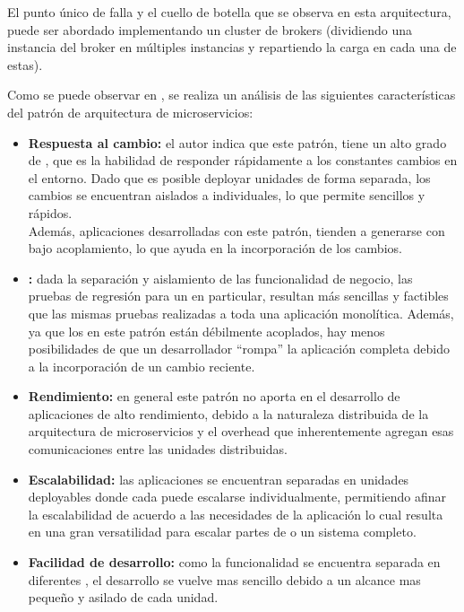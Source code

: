 El punto único de falla y el cuello de botella que se observa en esta arquitectura, puede ser abordado implementando un cluster de brokers (dividiendo una instancia del broker en múltiples instancias y repartiendo la carga en cada una de estas).\cite[p.~31]{richards2015}

Como se puede observar en \cite[p.~34]{richards2015}, se realiza un análisis de las siguientes características del patrón de arquitectura de microservicios:

\begin{itemize}
  \item \textbf{Respuesta al cambio:} el autor indica que este patrón, tiene un alto grado de , que es la habilidad de responder rápidamente a los constantes cambios en el entorno.  Dado que es posible deployar unidades de forma separada, los cambios se encuentran aislados a  individuales, lo que permite  sencillos y rápidos.\\
  Además, aplicaciones desarrolladas con este patrón, tienden a generarse con bajo acoplamiento, lo que ayuda en la incorporación de los cambios.

  \item \textbf{:} dada la separación y aislamiento de las funcionalidad de negocio, las pruebas de regresión para un  en particular, resultan más sencillas y factibles que las mismas pruebas realizadas a toda una aplicación monolítica.  Además, ya que los  en este patrón están débilmente acoplados, hay menos posibilidades de que un desarrollador ``rompa'' la aplicación completa debido a la incorporación de un cambio reciente.

  \item \textbf{Rendimiento:} en general este patrón no aporta en el desarrollo de aplicaciones de alto rendimiento, debido a la naturaleza distribuida de la arquitectura de microservicios y el overhead que inherentemente agregan esas comunicaciones entre las unidades distribuidas.

  \item \textbf{Escalabilidad:} las aplicaciones se encuentran separadas en unidades deployables donde cada  puede escalarse individualmente, permitiendo afinar la escalabilidad de acuerdo a las necesidades de la aplicación lo cual resulta en una gran versatilidad para escalar partes de o un sistema completo.

  \item \textbf{Facilidad de desarrollo:} como la funcionalidad se encuentra separada en diferentes , el desarrollo se vuelve mas sencillo debido a un alcance mas pequeño y asilado de cada unidad.
\end{itemize}
